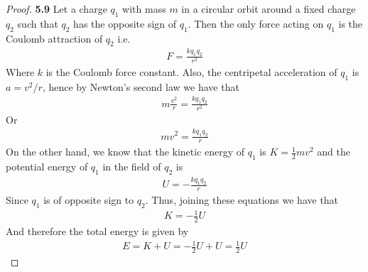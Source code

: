 \documentclass[11pt]{article}
\theoremstyle{definition}
\begin{document}
\begin{proof}{\textbf{5.9}}
    Let a charge $q_1$ with mass $m$ in a circular orbit around a fixed charge
    $q_2$ such that $q_2$ has the opposite sign of $q_1$.
    Then the only force acting on $q_1$ is the Coulomb attraction of $q_2$ i.e.
    \begin{align*}
        F = \frac{kq_1q_2}{r^2}
    \end{align*}
    Where $k$ is the Coulomb force constant. Also, the centripetal acceleration
    of $q_1$ is $a = v^2/r$, hence by Newton's second law we have that
    \begin{align*}
        m\frac{v^2}{r} = \frac{kq_1 q_2}{r^2}
    \end{align*}
    Or
    \begin{align*}
        mv^2 = \frac{kq_1 q_2}{r}
    \end{align*}
    On the other hand, we know that the kinetic energy of $q_1$ is
    $K = \frac{1}{2}mv^2$ and the potential energy of $q_1$ in the field
    of $q_2$ is
    \begin{align*}
        U = -\frac{kq_1 q_2}{r}
    \end{align*}
    Since $q_1$ is of opposite sign to $q_2$. Thus, joining these equations we
    have that 
    \begin{align*}
        K = -\frac{1}{2} U
    \end{align*}
    And therefore the total energy is given by
    \begin{align*}
        E = K + U = -\frac{1}{2}U + U = \frac{1}{2}U 
    \end{align*}
\end{proof}
\cleardoublepage
\end{document}

